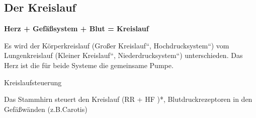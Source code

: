 \documentclass{article}
\newcommand\gEs[1]{\textbf{\textcolor[rgb]{0.0,0.0,0.5019608}{#1}}}
\newcommand\gEs[1]{\textbf{\textcolor[rgb]{0.0,0.0,0.5019608}{#1}}}
\begin{document}
\subsection{Der Kreislauf }
{\mdseries
\gEs{Herz}\gEs{ +
}\gEs{Gef\"a{\ss}system}\gEs{ +
}\gEs{Blut}\gEs{ = Kreislauf}}

{\mdseries
Es wird der K\"orperkreislauf ({\quotedblbase}Gro{\ss}er
Kreislauf{\textquotedblleft},
{\quotedblbase}Hochdrucksystem{\textquotedblleft}) vom Lungenkreislauf
({\quotedblbase}Kleiner Kreislauf{\textquotedblleft},
{\quotedblbase}Niederdrucksystem{\textquotedblleft}) unterschieden. Das
Herz ist die f\"ur beide Systeme die gemeinsame Pumpe.}

{\mdseries\color{black}
Kreislaufsteuerung}

{\mdseries
Das Stammhirn  steuert den Kreislauf  (RR + HF )*, Blutdruckrezeptoren
in den  Gef\"a{\ss}w\"anden (z.B.Carotis)}
\end{document}
